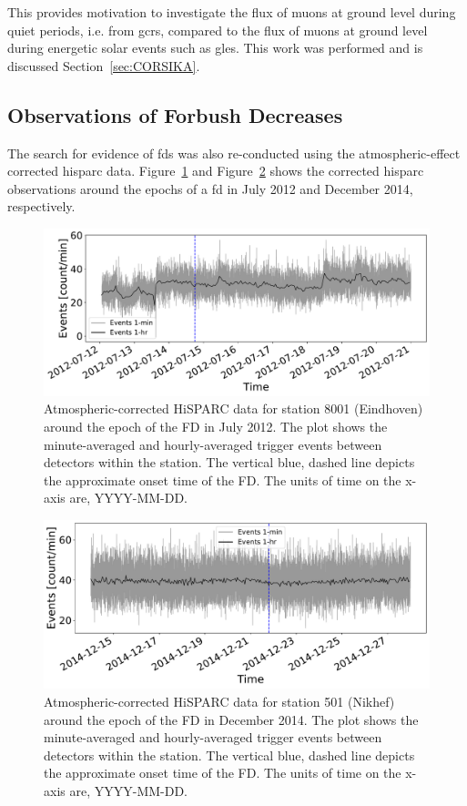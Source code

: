 This provides motivation to investigate the flux of muons at ground level during quiet periods, i.e. from \glspl{gcr}, compared to the flux of muons at ground level during energetic solar events such as \glspl{gle}. This work was performed and is discussed Section~\ref{sec:CORSIKA}.


\subsection{Observations of Forbush Decreases}

The search for evidence of \glspl{fd} was also re-conducted using the atmospheric-effect corrected \gls{hisparc} data. Figure~\ref{fig:FD_201207_8001_Pcorr} and Figure~\ref{fig:FD_201412_501_Pcorr} shows the corrected \gls{hisparc} observations around the epochs of a \gls{fd} in July 2012 and December 2014, respectively.

\begin{figure}[ht!]
	\centering
	\includegraphics[width=0.65\columnwidth]{FD_201207_8001_CORR.pdf}
	\caption{Atmospheric-corrected HiSPARC data for station 8001 (Eindhoven) around the epoch of the FD in July 2012. The plot shows the minute-averaged and hourly-averaged trigger events between detectors within the station. The vertical blue, dashed line depicts the approximate onset time of the FD. The units of time on the x-axis are, YYYY-MM-DD.}
	\label{fig:FD_201207_8001_Pcorr}
\end{figure}

\begin{figure}[ht!]
	\centering
	\includegraphics[width=0.65\columnwidth]{FD_201412_501_CORR.pdf}
	\caption{Atmospheric-corrected HiSPARC data for station 501 (Nikhef) around the epoch of the FD in December 2014. The plot shows the minute-averaged and hourly-averaged trigger events between detectors within the station. The vertical blue, dashed line depicts the approximate onset time of the FD. The units of time on the x-axis are, YYYY-MM-DD.}
	\label{fig:FD_201412_501_Pcorr}
\end{figure}


